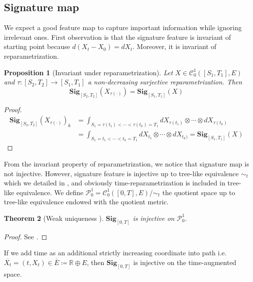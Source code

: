 \documentclass[12pt]{report}
\newtheorem{theorem}{Theorem}[chapter]
\newtheorem{proposition}[theorem]{Proposition}
\theoremstyle{definition}
\theoremstyle{remark}
\newcommand{\R}{\mathbb{R}}
\begin{document}
\subsection{Signature map}
We expect a good feature map to capture important information while ignoring irrelevant ones. First observation is that the signature feature is invariant of starting point because $d(X_{t} - X_{0}) = dX_{t}$. Moreover, it is invariant of reparametrization.
\begin{proposition}[Invariant under reparametrization]\label{invariant}
  Let $X \in \mathcal{C}^{1}_{0}([S_{1},T_{1}],E)$ and  $\tau\colon [S_{2},T_{2}] \to [S_{1},T_{1}]$ a non-decreasing surjective reparametrization. Then 
  \begin{equation}
    \mathbf{Sig}_{[S_{2},T_{2}]}(X_{\tau(\cdot)}) = \mathbf{Sig}_{[S_{1},T_{1}]}(X) 
  \end{equation}
\end{proposition}
\begin{proof}
  \begin{equation}
    \begin{split}
      \mathbf{Sig}_{[S_{2},T_{2}]}(X_{\tau(\cdot)})_{k} &= \int_{S_{1} = \tau(t_{1})<\cdots< \tau(t_{k}) = T_{1}}dX_{\tau(t_{1})}\otimes\cdots\otimes dX_{\tau(t_{k})}\\
      &= \int_{S_{1} = t_{1}<\cdots< t_{k} = T_{1}}dX_{t_{1}}\otimes\cdots\otimes dX_{t_{k})} = \mathbf{Sig}_{[S_{1},T_{1}]}(X) 
    \end{split}
  \end{equation}
\end{proof}
From the invariant property of reparametrization, we notice that signature map is not injective. However, signature feature is injective up to tree-like equivalence $\sim_{t}$ which we detailed in \cite{boedihardjo2016signature}, and obviously time-reparametrization is included in tree-like equivalence. We define $\mathcal{P}_{0}^{1} = \mathcal{C}^{1}_{0}([0,T],E) / \sim_{t}$ the quotient space up to tree-like equivalence endowed with the quotient metric.  
\begin{theorem}[Weak uniqueness \cite{boedihardjo2016signature}] \label{uniqueness}
  $\mathbf{Sig}_{[0,T]}$ is injective on $\mathcal{P}_{0}^{1}$.
\end{theorem}
\begin{proof}
  See \cite{boedihardjo2016signature}.
\end{proof}
If we add time as an additional strictly increasing coordinate into path i.e. $\overline{X_{t}} = (t,X_{t}) \in \overline{E} \coloneq \R\oplus E$, then $\mathbf{Sig}_{[0,T]}$ is injective on the time-augmented space. 
\end{document}
